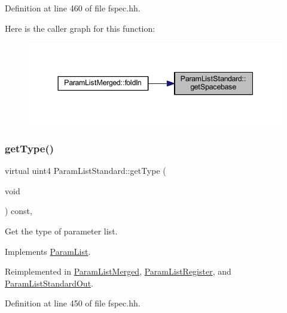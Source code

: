 Definition at line 460 of file fspec.\+hh.

Here is the caller graph for this function\+:
\nopagebreak
\begin{figure}[H]
\begin{center}
\leavevmode
\includegraphics[width=344pt]{class_param_list_standard_a8c6910cf8fb253c2f64361dbf92901c5_icgraph}
\end{center}
\end{figure}
\mbox{\label{class_param_list_standard_a37193293ffb24b1206944e35ef64973c}} 
\subsubsection{\texorpdfstring{getType()}{getType()}}
{\footnotesize\ttfamily virtual uint4 Param\+List\+Standard\+::get\+Type (\begin{DoxyParamCaption}\item[{void}]{ }\end{DoxyParamCaption}) const\hspace{0.3cm}{\ttfamily [inline]}, {\ttfamily [virtual]}}



Get the type of parameter list. 



Implements \mbox{\hyperlink{class_param_list_a9e3de5eb123af1ab9122de9f32e63859}{Param\+List}}.



Reimplemented in \mbox{\hyperlink{class_param_list_merged_a39f0621f7d34c4aa4d591fd51b2ab5fe}{Param\+List\+Merged}}, \mbox{\hyperlink{class_param_list_register_af11af105230d3d6bf2824ae8b6a527a6}{Param\+List\+Register}}, and \mbox{\hyperlink{class_param_list_standard_out_a8d0f947ba2b94e2921712114d986f74f}{Param\+List\+Standard\+Out}}.



Definition at line 450 of file fspec.\+hh.

